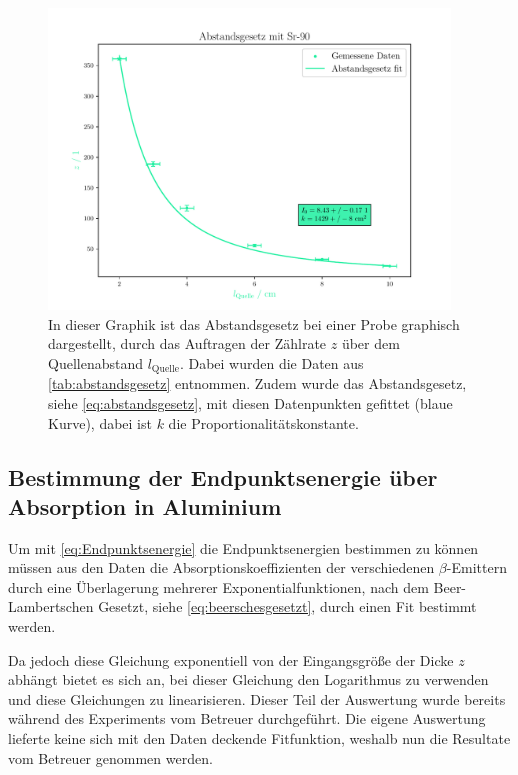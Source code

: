 \documentclass[12pt,english,ngerman]{scrartcl}
\begin{document}
\begin{figure}[H]
	\begin{center}
		\includegraphics[width = 0.95\textwidth]{figures/abstandsgesetz.pdf}
	\end{center}
	\caption[Abstandsgesetz einer  Probe]{
		In dieser Graphik ist das
		Abstandsgesetz bei einer  Probe graphisch dargestellt, durch
		das Auftragen der Zählrate $z$ über dem Quellenabstand $l_{\mathrm{Quelle}}$.
		Dabei wurden die Daten aus \autoref{tab:abstandsgesetz} entnommen. Zudem wurde
		das Abstandsgesetz, siehe \autoref{eq:abstandsgesetz}, mit diesen Datenpunkten
		gefittet (blaue Kurve), dabei ist $k$ die Proportionalitätskonstante.
	}\label{fig:abstandsgesetz}
\end{figure}

\subsection{Bestimmung der Endpunktsenergie über Absorption in Aluminium}\label{sec:Auswertung_alu}

Um mit \autoref{eq:Endpunktsenergie} die Endpunktsenergien bestimmen zu können
müssen aus den Daten die Absorptionskoeffizienten der verschiedenen
$\beta$-Emittern durch eine Überlagerung mehrerer Exponentialfunktionen, nach
dem Beer-Lambertschen Gesetzt, siehe \autoref{eq:beerschesgesetzt}, durch einen
Fit bestimmt werden.

Da jedoch diese Gleichung exponentiell von der Eingangsgröße der Dicke $z$
abhängt bietet es sich an, bei dieser Gleichung den Logarithmus zu verwenden
und diese Gleichungen zu linearisieren. Dieser Teil der Auswertung wurde
bereits während des Experiments vom Betreuer durchgeführt. Die eigene
Auswertung lieferte keine sich mit den Daten deckende Fitfunktion, weshalb nun
die Resultate vom Betreuer genommen werden.
\end{document}
